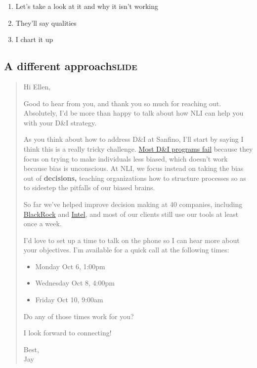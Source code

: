 \documentclass[12pt]{article}
\begin{document}
\begin{enumerate}
\item Let's take a look at it and why it isn't working
\item They'll say qualities
\item I chart it up
\end{enumerate}

\subsection[A different approach]{A different approach\hfill{}\textsc{slide}}
\label{sec:org1aeec36}
\begin{quote}
Hi Ellen,

Good to hear from you, and thank you so much for reaching out. Absolutely, I'd be more than happy to talk about how NLI can help you with your D\&I strategy.

As you think about how to address D\&I at Sanfino, I'll start by saying I think this is a really tricky challenge. \href{//hbr.org/2016/07/why-diversity-programs-fail}{Most D\&I programs fail} because they focus on trying to make individuals less biased, which doesn't work because bias is unconscious. At NLI, we focus instead on taking the bias out of \textbf{decisions,} teaching organizations how to structure processes so as to sidestep the pitfalls of our biased brains.

So far we've helped improve decision making at 40 companies, including \href{https://neuroleadership.com/portfolio-items/case-study-blackrock-breaking-bias/}{BlackRock} and \href{https://neuroleadership.com/portfolio-items/nli-transforms-intel-culture/}{Intel}, and most of our clients still use our tools at least once a week.

I'd love to set up a time to talk on the phone so I can hear more about your objectives. I'm available for a quick call at the following times:

\begin{itemize}
\item Monday Oct 6, 1:00pm
\item Wednesday Oct 8, 4:00pm
\item Friday Oct 10, 9:00am
\end{itemize}

Do any of those times work for you?

I look forward to connecting!

Best, \\
Jay
\end{quote}
\end{document}
